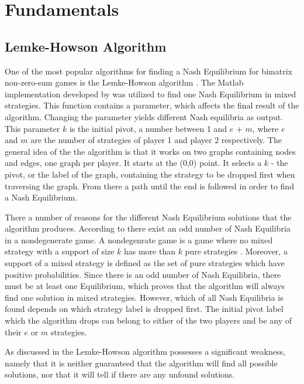 \chapter{Fundamentals}
\label{chp:basics}

\section{Lemke-Howson Algorithm}
One of the most popular algorithms for finding a Nash Equilibrium for bimatrix non-zero-sum games is the Lemke-Howson algorithm \citep{lemke1964equilibrium}. The Matlab implementation developed by \citep{lemkeHowson2014Matlab} was utilized to find one Nash Equilibrium in mixed strategies. This function contains a parameter, which affects the final result of the algorithm. Changing the parameter yields different Nash equilibria as output. This parameter $k$ is the initial pivot, a number between 1 and $e$ + $m$, where $e$ and $m$ are the number of strategies of player 1 and player 2 respectively. The general idea of the the algorithm is that it works on two graphs containing nodes and edges, one graph per player. It starts at the (0,0) point. It selects a $k$ - the pivot, or the label of the graph, containing the strategy to be dropped first when traversing the graph. From there a path until the end is followed in order to find a Nash Equilibrium. 

There a number of reasons for the different Nash Equilibrium solutions that the algorithm produces. According to \cite{lemke1964equilibrium} there exist an odd number of Nash Equilibria in a nondegenerate game. A nondegenrate game is a game where no mixed strategy with a support of size $k$ has more than $k$ pure strategies \citet{nisan2007algorithmic}. Moreover, a support of a mixed strategy is defined as the set of pure strategies which have positive probabilities. Since there is an odd number of Nash Equilibria, there must be at least one Equilibrium, which proves that the algorithm will always find one solution in mixed strategies. However, which of all Nash Equilibria is found depends on which strategy label is dropped first. The initial pivot label which the algorithm drops can belong to either of the two players and be any of their $e$ or $m$ strategies.

As discussed in \citep{shapley1974note} the Lemke-Howson algorithm possesses a significant weakness, namely that it is neither guaranteed that the algorithm will find all possible solutions, nor that it will tell if there are any unfound solutions.

